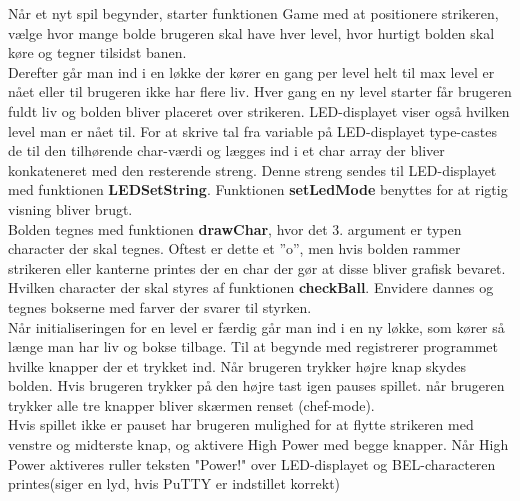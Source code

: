 Når et nyt spil begynder, starter funktionen Game med at positionere strikeren, vælge hvor mange bolde brugeren skal have hver level, hvor hurtigt bolden skal køre og tegner tilsidst banen. \\ Derefter går man ind i en løkke der kører en gang per level helt til max level er nået eller til brugeren ikke har flere liv. Hver gang en ny level starter får brugeren fuldt liv og bolden bliver placeret over strikeren. LED-displayet viser også hvilken level man er nået til. For at skrive tal fra variable på LED-displayet type-castes de til den tilhørende char-værdi og lægges ind i et char array der bliver konkateneret med den resterende streng. Denne streng sendes  til LED-displayet med funktionen \textbf{LEDSetString}. Funktionen \textbf{setLedMode} benyttes for at rigtig visning bliver brugt.\\
Bolden tegnes med funktionen \textbf{drawChar}, hvor det 3. argument er typen character der skal tegnes. Oftest er dette et ”o”, men hvis bolden rammer strikeren eller kanterne printes  der en char der gør at disse bliver grafisk bevaret. Hvilken character der skal styres af funktionen \textbf{checkBall}. Envidere dannes og tegnes bokserne med farver der svarer til styrken.\\
Når initialiseringen for en level er færdig går man ind i en ny løkke, som kører så længe man har liv og bokse tilbage. Til at begynde med registrerer programmet hvilke knapper der et trykket ind. Når brugeren trykker højre knap skydes bolden.  Hvis brugeren trykker på den højre tast igen pauses spillet. når brugeren trykker alle tre knapper bliver skærmen renset (chef-mode).\\
Hvis spillet ikke er pauset har brugeren mulighed for at flytte strikeren med venstre og midterste knap, og aktivere High Power med begge knapper. Når High Power aktiveres ruller teksten "Power!" over LED-displayet og BEL-characteren printes(siger en lyd, hvis PuTTY er indstillet korrekt)\\

